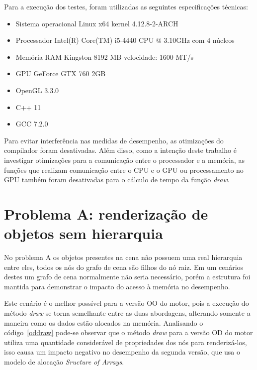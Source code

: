 Para a execução dos testes, foram utilizadas as seguintes 
especificações técnicas: \\

\begin{itemize}
    \item Sistema operacional Linux x64 kernel 4.12.8-2-ARCH
    \item Processador Intel(R) Core(TM) i5-4440 CPU @ 3.10GHz com 4 núcleos
    \item Memória RAM Kingston 8192 MB velocidade: 1600 MT/s
    \item GPU GeForce GTX 760 2GB 
    \item OpenGL 3.3.0
    \item C++ 11
    \item GCC 7.2.0
\end{itemize}

Para evitar interferência nas medidas de desempenho, as otimizações 
do compilador foram desativadas. Além disso, como a intenção deste 
trabalho é investigar otimizações para a comunicação entre o 
processador e a memória, as funções que realizam comunicação entre 
o CPU e o GPU ou processamento no GPU também foram desativadas
para o cálculo de tempo da função \textit{draw}.

\section{Problema A: renderização de objetos sem hierarquia}

No problema A os objetos presentes na cena não possuem uma real 
hierarquia entre eles, todos os nós do grafo de cena são filhos 
do nó raiz. Em um cenários destes um grafo de cena normalmente 
não seria necessário, porém a estrutura foi mantida para 
demonstrar o impacto do acesso à memória no desempenho.

Este cenário é o melhor possível para a versão OO do motor, pois 
a execução do método \textit{draw} se torna semelhante entre as 
duas abordagens, alterando somente a maneira como os dados estão 
alocados na memória. Analisando o código~\ref{oddraw} pode-se 
observar que o método \textit{draw} para a versão OD do motor 
utiliza uma quantidade considerável de propriedades dos nós 
para renderizá-los, isso causa um impacto negativo no desempenho
da segunda versão, que usa o modelo de alocação \textit{Sructure 
of Arrays}. 


